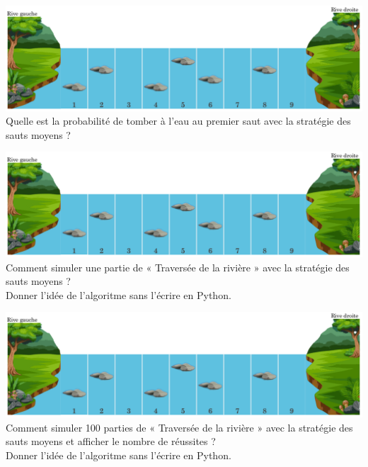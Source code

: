 \documentclass[a4paper,11pt,exos]{nsi} %
\begin{document}
\includegraphics[width=17cm]{image.png}\\
Quelle est la probabilité de tomber à l'eau au premier saut avec la stratégie des sauts moyens ?

\newpage
{}
\includegraphics[width=17cm]{image.png}\\
Comment simuler une partie de « Traversée de la rivière » avec la stratégie des sauts moyens ?\\[.5em]
Donner l'idée de l'algoritme sans l'écrire en Python.

\includegraphics[width=17cm]{image.png}\\
Comment simuler 100 parties de « Traversée de la rivière » avec la stratégie des sauts moyens et afficher le nombre de réussites ?\\[.5em]
Donner l'idée de l'algoritme sans l'écrire en Python.
\end{document}
